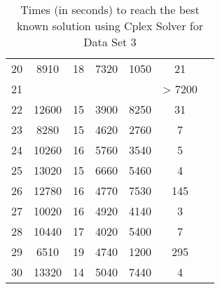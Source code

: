 \begin{table}
\begin{tabular}{ccccccc}
20 &   8910	& 18 & 7320 & 1050 & 21  \\

21 &  	&  &  &   &  > 7200  \\

22 &  12600	& 15 & 3900 & 8250 & 31   \\

23 &  8280 	& 15 & 4620 & 2760 & 7  \\

24 &  10260	& 16 & 5760 & 3540 & 5  \\

25 &  13020	& 15 & 6660 & 5460 & 4     \\

26 &  12780	& 16 & 4770 & 7530 & 145  \\

27 &  10020	& 16 & 4920 & 4140 & 3   \\

28 &   10440	& 17 & 4020 & 5400 & 7  \\

29 &  6510	& 19 & 4740 & 1200  & 295 \\

30 &  13320	& 14 & 5040 & 7440 & 4   \\
\hline
\end{tabular}
\caption{Times (in seconds) to reach the best known solution using Cplex Solver for Data Set 3}
\label{tbl:dataset3cplex}
\end{table}



